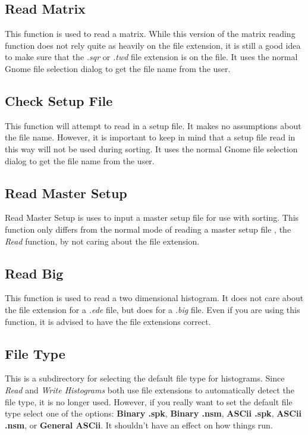 \subsection{Read Matrix}

This function is used to read a matrix.  While this version of the matrix reading function does not rely quite as heavily on the file extension, it is still a good idea to make sure that the {\it .sqr} or {\it .twd} file extension is on the file.  It uses the normal Gnome file selection dialog to get the file name from the user.

\subsection{Check Setup File}

This function will attempt to read in a setup file.  It makes no assumptions about the file name.  However, it is important to keep in mind that a setup file read in this way will not be used during sorting.  It uses the normal Gnome file selection dialog to get the file name from the user.

\subsection{Read Master Setup}

Read Master Setup is uses to input a master setup file for use with sorting.  This function only differs from the normal mode of reading a master setup file , the {\it Read} function, by not caring about the file extension.

\subsection{Read Big}

This function is used to read a two dimensional histogram.  It does not care about the file extension for a {\it .ede} file, but does for a {\it .big} file.  Even if you are using this function, it is advised to have the file extensions correct.

\subsection{File Type}

This is a subdirectory for selecting the default file type for histograms.  Since {\it Read} and {\it Write Histograms} both use file extensions to automatically detect the file type, it is no longer used.  However, if you really want to set the default file type select one of the options: {\bf Binary .spk}, {\bf Binary .nsm}, {\bf ASCii .spk}, {\bf ASCii .nsm}, or {\bf General ASCii}.  It shouldn't have an effect on how things run.

